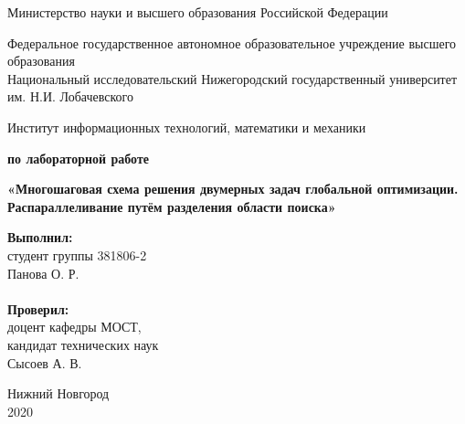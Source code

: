 \documentclass{report}
\begin{document}
\begin{titlepage}

\begin{center}
Министерство науки и высшего образования Российской Федерации
\end{center}

\begin{center}
Федеральное государственное автономное образовательное учреждение высшего образования \\
Национальный исследовательский Нижегородский государственный университет им. Н.И. Лобачевского
\end{center}

\begin{center}
Институт информационных технологий, математики и механики
\end{center}

\vspace{4em}

\begin{center}
\textbf{ по лабораторной работе} \\
\end{center}
\begin{center}
\textbf{\Large«Многошаговая схема решения двумерных задач глобальной оптимизации. Распараллеливание путём разделения области поиска»} \\
\end{center}

\vspace{4em}

\newbox{\lbox}
\newlength{\maxl}
\setlength{\maxl}{\wd\lbox}
\hfill\parbox{7cm}{
\hspace*{5cm}\hspace*{-5cm}\textbf{Выполнил:} \\ студент группы 381806-2 \\ Панова О. Р.\\
\\
\hspace*{5cm}\hspace*{-5cm}\textbf{Проверил:}\\ доцент кафедры МОСТ, \\ кандидат технических наук \\ Сысоев А. В.\\
}
\vspace{\fill}

\begin{center} Нижний Новгород \\ 2020 \end{center}

\end{titlepage}
\end{document}
